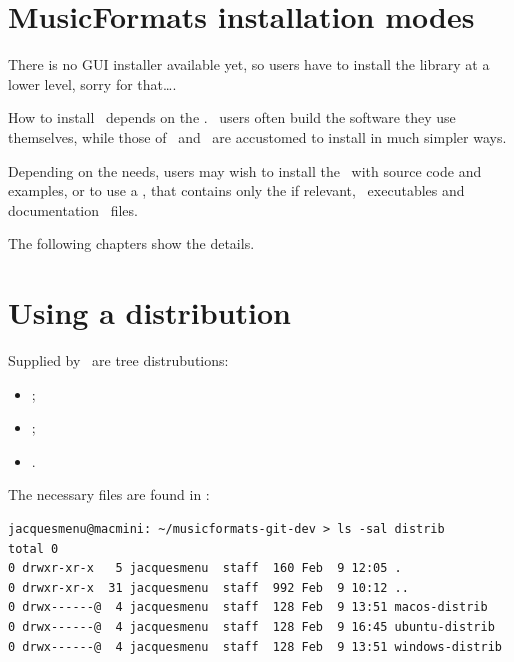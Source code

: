 
\chapter{MusicFormats installation modes}

There is no GUI installer available yet, so users have to install the library at a lower level, sorry for that\dots.

How to install \mf\ depends on the \OS. \Linux\ users often build the software they use themselves, while those of \Windows\ and \MacOS\ are accustomed to install in much simpler ways.

Depending on the needs, users may wish to install the  \mf\ with source code and examples, or to use a , that contains only the  if relevant, \CLI\ executables and documentation \pdf\ files.

The following chapters show the details.


\chapter{Using a distribution}

Supplied by \mf\ are tree distrubutions:
\begin{itemize}
\item \MacOS;
\item \Ubuntu;
\item \Windows.
\end{itemize}

The necessary files are found in :
\begin{lstlisting}[language=Terminal]
jacquesmenu@macmini: ~/musicformats-git-dev > ls -sal distrib
total 0
0 drwxr-xr-x   5 jacquesmenu  staff  160 Feb  9 12:05 .
0 drwxr-xr-x  31 jacquesmenu  staff  992 Feb  9 10:12 ..
0 drwx------@  4 jacquesmenu  staff  128 Feb  9 13:51 macos-distrib
0 drwx------@  4 jacquesmenu  staff  128 Feb  9 16:45 ubuntu-distrib
0 drwx------@  4 jacquesmenu  staff  128 Feb  9 13:51 windows-distrib
\end{lstlisting}


